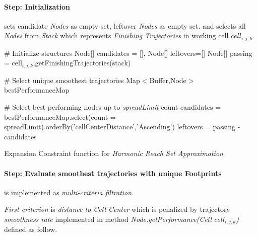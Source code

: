 \paragraph{Step: Initialization} sets candidate \emph{Nodes} as empty set, leftover \emph{Nodes} as empty set. and selects all \emph{Nodes} from \emph{Stack} which represents  \emph{Finishing Trajectories} in working cell $cell_{i,j,k}$.
\newpage
\begin{algorithm}[H]
    
    \BlankLine
    \# Initialize structures\;
    Node[] candidates = [], Node[] leftovers=[]\;
    Node[] passing = cell$_{i,j,k}$.getFinishingTrajectories(stack)\;
    
    \BlankLine
    \# Select unique smoothest trajectories\;
    Map$<$Buffer,Node$>$  bestPerformanceMap\;
    \For{Node test $\in$ passing}{
        centerDistance= test.getPerformance(cell$_{i,j,k}$)]\;
        footPrint = test.getFootprint()\;
        \eIf{bestPerformanceMap.contains(footPrint)}{
            old = bestPerformanceMap.getByKey(footprint)\;
            oldPerformance= old.getPerformance(cell$_{i,j,k}$)\;
            \If{oldPerformance $>$ centerDistance}{
                bestPerformanceMap.setByKey(footprint,test)\;         
            }
        }{
            bestPerformanceMap.setByKey(footprint,test)\;
        }
    }
    
    \BlankLine
    \# Select best performing nodes up to \emph{spreadLimit} count\;
    candidates = bestPerformanceMap.select(count = spreadLimit).orderBy('cellCenterDistance','Ascending')\;
    leftovers = passing - candidates\;
    
    
    \caption{Expansion Constraint function for \emph{Harmonic Reach Set Approximation}}
    \label{alg:ExpansionConstraintFunctionForHarmonicReachSet}    
\end{algorithm}

\paragraph{Step: Evaluate smoothest trajectories with unique Footprints} is implemented as \emph{multi-criteria filtration}. 

\emph{First criterion} is \emph{distance to Cell Center} which is penalized by trajectory \emph{smoothness rate} implemented in method \emph{Node.getPerformance(Cell $cell_{i,j,k}$)} defined as follow.

